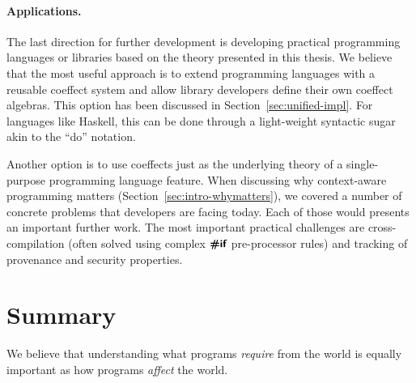 
\paragraph{Applications.}
The last direction for further development is developing practical programming languages or
libraries based on the theory presented in this thesis. We believe that the most useful approach
is to extend programming languages with a reusable coeffect system and allow library developers 
define their own coeffect algebras. This option has been discussed in Section~\ref{sec:unified-impl}.
For languages like Haskell, this can be done through a light-weight syntactic sugar akin to the
``do'' notation.

Another option is to use coeffects just as the underlying theory of a single-purpose programming
language feature. When discussing why context-aware programming matters (Section~\ref{sec:intro-whymatters}),
we covered a number of concrete problems that developers are facing today. Each of those would
presents an important further work. The most important practical challenges are cross-compilation 
(often solved using complex $\prepk{\#if}$ pre-processor rules) and tracking of provenance
and security properties.



%
%

\section{Summary}
\label{sec:conc-conclusions}

We believe that understanding what programs \emph{require} from the world is equally important as 
how programs \emph{affect} the world. 

